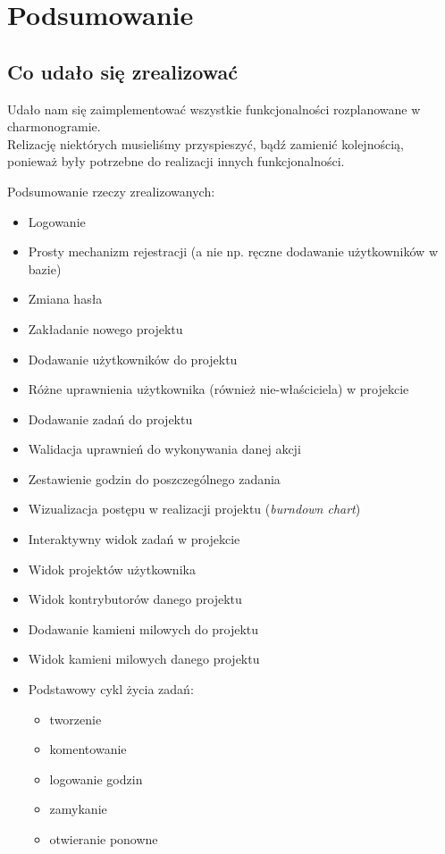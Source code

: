 \documentclass[a4paper,12pt,notitlepage]{mwrep}
\begin{document}
\chapter{Podsumowanie}
\section{Co udało się zrealizować}
Udało nam się zaimplementować wszystkie funkcjonalności rozplanowane w charmonogramie.\\
Relizację niektórych musieliśmy przyspieszyć, bądź zamienić kolejnością, ponieważ były
potrzebne do realizacji innych funkcjonalności.\de

Podsumowanie rzeczy zrealizowanych:
\begin{itemize}
	\item	Logowanie
	\item	Prosty mechanizm rejestracji (a nie np. ręczne dodawanie użytkowników w bazie)
	\item	Zmiana hasła
	\item	Zakładanie nowego projektu
	\item	Dodawanie użytkowników do projektu
	\item	Różne uprawnienia użytkownika (również nie-właściciela) w projekcie
	\item	Dodawanie zadań do projektu
	\item	Walidacja uprawnień do wykonywania danej akcji
	\item	Zestawienie godzin do poszczególnego zadania
	\item	Wizualizacja postępu w realizacji projektu (\emph{burndown chart})
	\item	Interaktywny widok zadań w projekcie
	\item	Widok projektów użytkownika
	\item	Widok kontrybutorów danego projektu
	\item	Dodawanie kamieni milowych do projektu
	\item	Widok kamieni milowych danego projektu
	\item	Podstawowy cykl życia zadań:
			\begin{itemize}
				\item	tworzenie
				\item	komentowanie
				\item	logowanie godzin
				\item	zamykanie
				\item	otwieranie ponowne
			\end{itemize}
\end{itemize}
\end{document}
